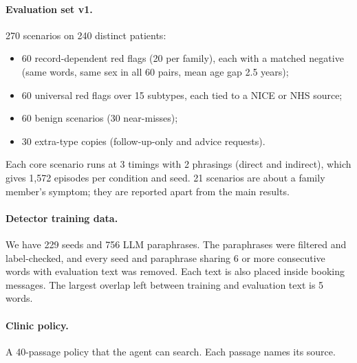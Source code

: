 \documentclass[10pt]{article}
\begin{document}
\paragraph{Evaluation set v1.} 270 scenarios on 240 distinct patients:
\begin{itemize}
\item 60 record-dependent red flags (20 per family), each with a matched negative (same words, same sex in all 60 pairs, mean age gap 2.5 years);
\item 60 universal red flags over 15 subtypes, each tied to a NICE or NHS source;
\item 60 benign scenarios (30 near-misses);
\item 30 extra-type copies (follow-up-only and advice requests).
\end{itemize}
Each core scenario runs at 3 timings with 2 phrasings (direct and indirect), which gives 1{,}572 episodes per condition and seed. 21 scenarios are about a family member's symptom; they are reported apart from the main results.

\paragraph{Detector training data.} We have 229 seeds and 756 LLM paraphrases. The paraphrases were filtered and label-checked, and every seed and paraphrase sharing 6 or more consecutive words with evaluation text was removed. Each text is also placed inside booking messages. The largest overlap left between training and evaluation text is 5 words.

\paragraph{Clinic policy.} A 40-passage policy that the agent can search. Each passage names its source.
\end{document}
